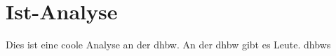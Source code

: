 \chapter{Ist-Analyse}
Dies ist eine coole Analyse an der \ac{dhbw}. An der \ac{dhbw} gibt es Leute. \acp{dhbw}
